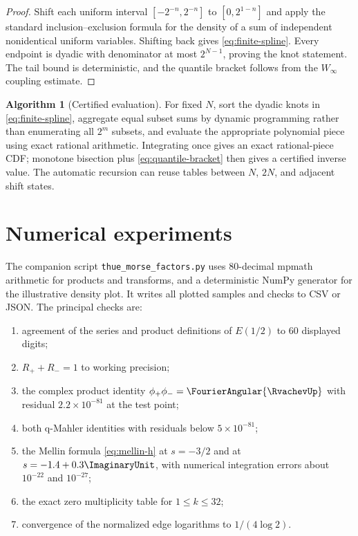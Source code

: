 \documentclass[11pt,oneside]{article}
\numberwithin{equation}{section}
\theoremstyle{definition}
\newtheorem{algorithm}[theorem]{Algorithm}
\theoremstyle{remark}
\begin{document}
\begin{proof}
Shift each uniform interval $[-2^{-n},2^{-n}]$ to $[0,2^{1-n}]$ and apply the standard
inclusion--exclusion formula for the density of a sum of independent nonidentical uniform
variables.  Shifting back gives \eqref{eq:finite-spline}.  Every endpoint is dyadic with
denominator at most $2^{N-1}$, proving the knot statement.  The tail bound is deterministic,
and the quantile bracket follows from the $W_\infty$ coupling estimate.
\end{proof}

\begin{algorithm}[Certified evaluation]
For fixed $N$, sort the dyadic knots in \eqref{eq:finite-spline}, aggregate equal subset
sums by dynamic programming rather than enumerating all $2^m$ subsets, and evaluate the
appropriate polynomial piece using exact rational arithmetic.  Integrating once gives an
exact rational-piece CDF; monotone bisection plus \eqref{eq:quantile-bracket} then gives a
certified inverse value.  The automatic recursion can reuse tables between $N$, $2N$, and
adjacent shift states.
\end{algorithm}

\section{Numerical experiments}
\label{sec:numerics}

The companion script \texttt{thue\_morse\_factors.py} uses 80-decimal mpmath arithmetic
for products and transforms, and a deterministic NumPy generator for the illustrative
density plot.  It writes all plotted samples and checks to CSV or JSON.  The principal
checks are:
\begin{enumerate}
\item agreement of the series and product definitions of $E(1/2)$ to 60 displayed digits;
\item $R_++R_-=1$ to working precision;
\item the complex product identity $\phi_+\phi_-=\FourierAngular{\RvachevUp}$ with residual
$2.2\times10^{-81}$ at the test point;
\item both q-Mahler identities with residuals below $5\times10^{-81}$;
\item the Mellin formula \eqref{eq:mellin-h} at $s=-3/2$ and at
$s=-1.4+0.3\ImaginaryUnit$, with numerical integration errors about $10^{-22}$ and $10^{-27}$;
\item the exact zero multiplicity table for $1\le k\le32$;
\item convergence of the normalized edge logarithms to $1/(4\log2)$.
\end{enumerate}
\end{document}
